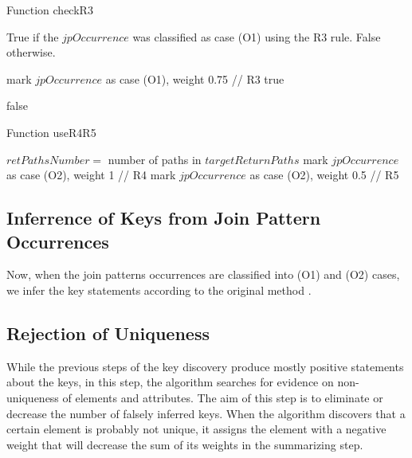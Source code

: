 \begin{algorithm}
\caption{Function checkR3}
\label{ALG_function_check_r3}
\begin{algorithmic}[1]

\ENSURE True if the $jpOccurrence$ was classified as case (O1) using the R3 rule. False otherwise.

        \STATE mark $jpOccurrence$ as case (O1), weight 0.75 // R3
        \RETURN true
    \ENDIF
\ENDFOR

\RETURN false
\end{algorithmic}
\end{algorithm}

\begin{algorithm}
\caption{Function useR4R5}
\label{ALG_function_use_r4_r5}
\begin{algorithmic}[1]

\STATE $retPathsNumber = $ number of paths in $targetReturnPaths$
	\STATE mark $jpOccurrence$ as case (O2), weight 1 // R4
\ELSE
	\STATE mark $jpOccurrence$ as case (O2), weight 0.5 // R5
\ENDIF
\end{algorithmic}
\end{algorithm}

\subsection{Inferrence of Keys from Join Pattern Occurrences}
Now, when the join patterns occurrences are classified into (O1) and (O2) cases, we infer the key statements according to the original method \cite{Necasky:2009:DXK:1529282.1529414}.

\subsection{Rejection of Uniqueness}
While the previous steps of the key discovery produce mostly positive statements about the keys, in this step, the algorithm searches for evidence on non-uniqueness of elements and attributes. The aim of this step is to eliminate or decrease the number of falsely inferred keys.
When the algorithm discovers that a certain element is probably not unique, it assigns the element with a negative weight that will decrease the sum of its weights in the summarizing step.

